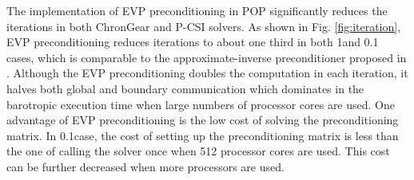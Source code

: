 The implementation of EVP preconditioning in POP significantly reduces the iterations in both ChronGear and P-CSI solvers. 
As shown in Fig. \ref{fig:iteration}, EVP preconditioning reduces  iterations to about one third in both 1\degree and 0.1 \degree cases, which is comparable to the approximate-inverse preconditioner proposed in \cite{smith1992parallel}. 
Although the EVP preconditioning doubles the computation in each iteration, it halves both global and boundary communication
which dominates in the barotropic execution time when large numbers of processor cores are used.
One advantage of EVP preconditioning is the low cost of solving the preconditioning matrix. 
In 0.1\degree case, the cost of setting up the preconditioning matrix is less than the one of calling the solver once when 512 processor cores are used. 
This cost can be further decreased when more processors are used. 
